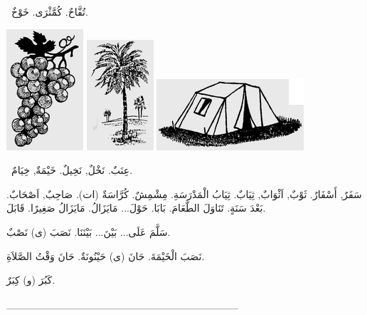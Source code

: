 \documentclass[a5paper]{article}
\begin{document}
\ تُفَّاحٌ. كُمَّثْرَى. خَوْخٌ. 

 \includegraphics[width=1.1252in,height=1.7709in]{MuhammadBagauddinlatinized-img137.png}   \includegraphics[width=0.9791in,height=1.6146in]{MuhammadBagauddinlatinized-img138.png}   \includegraphics[width=2.1563in,height=1.0417in]{MuhammadBagauddinlatinized-img139.png} 

\ عِنَبٌ. نَخْلٌ, نَخِيلٌ. خَيْمَةٌ, خِيَامٌ. 

سَفَرٌ, أَسْفَارٌ. ثَوْبٌ, اَثْوَابٌ, ثِيَابٌ. ثِيَابُ الْمَدْرَسَةِ. مِشْمِشٌ. كُرَّاسَةٌ (ات). صَاحِبٌ, اَصْحَابٌ. بَعْدَ سَنَةٍ. تَنَاوَلَ الطَّعَامَ. بَابَا. حَوْلَ... مَايَزَالُ. مَايَزَالُ صَغِيرًا. قَابَلَ. 

سَلَّمَ عَلَى... بَيْنَ... بَيْنَنَا. نَصَبَ (ى) نَصْبٌ. 

نَصَبَ الْخَيْمَةَ. حَانَ (ى) حَيْنُونَةٌ. حَانَ وَقْتُ الصَّلاَةِ. 

كَبُرَ (و) كِبَرٌ.

\_\_\_\_\_\_\_\_\_\_\_\_\_\_\_\_\_\_\_\_\_\_\_\_\_\_\_\_\_\_\_
\end{document}
